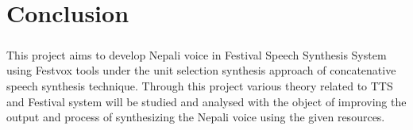 \documentclass{report}
\begin{document}
	\chapter{Conclusion}
		\paragraph{}
			This project aims to develop Nepali voice in Festival Speech Synthesis System using Festvox tools under the unit selection synthesis approach of concatenative speech synthesis technique. Through this project various theory related to TTS and Festival system will be studied and analysed with the object of improving the output and process of synthesizing the Nepali voice using the given resources.






	\newpage
	
	
\end{document}
